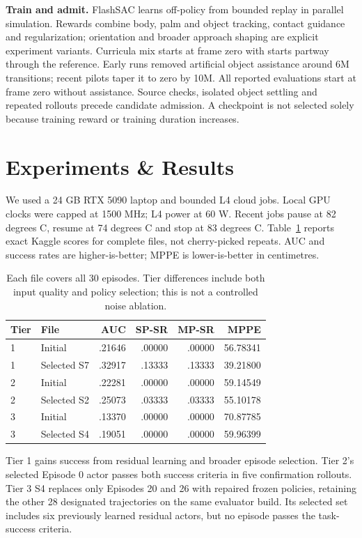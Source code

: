 \documentclass[10pt]{nvidiaextabstract}
\begin{document}
\textbf{Train and admit.}
FlashSAC learns off-policy from bounded replay in parallel simulation. Rewards
combine body, palm and object tracking, contact guidance and regularization;
orientation and broader approach shaping are explicit experiment variants.
Curricula mix starts at frame zero with starts partway through the reference.
Early runs removed artificial object assistance around 6M transitions; recent
pilots taper it to zero by 10M. All reported evaluations start at frame zero
without assistance. Source checks, isolated object settling and repeated
rollouts precede candidate admission. A checkpoint is not selected solely
because training reward or training duration increases.

\section{Experiments \& Results}
We used a 24 GB RTX 5090 laptop and bounded L4 cloud jobs. Local GPU clocks were
capped at 1500 MHz; L4 power at 60 W. Recent jobs pause at 82 degrees C, resume at
74 degrees C and stop at 83 degrees C. Table~\ref{tab:results} reports exact Kaggle
scores for complete files, not cherry-picked repeats. AUC and success rates
are higher-is-better; MPPE is lower-is-better in centimetres.
\begin{table}[t]
\centering\small\setlength{\tabcolsep}{3pt}
\begin{tabular}{llrrrr}
\toprule
Tier & File & AUC & SP-SR & MP-SR & MPPE\\
\midrule
1 & Initial & .21646 & .00000 & .00000 & 56.78341\\
1 & Selected S7 & .32917 & .13333 & .13333 & 39.21800\\
2 & Initial & .22281 & .00000 & .00000 & 59.14549\\
2 & Selected S2 & .25073 & .03333 & .03333 & 55.10178\\
3 & Initial & .13370 & .00000 & .00000 & 70.87785\\
3 & Selected S4 & .19051 & .00000 & .00000 & 59.96399\\
\bottomrule
\end{tabular}
\caption{Each file covers all 30 episodes. Tier differences include both input
quality and policy selection; this is not a controlled noise ablation.}
\label{tab:results}
\end{table}

Tier 1 gains success from residual learning and broader episode selection.
Tier 2's selected Episode 0 actor passes both success criteria in five
confirmation rollouts. Tier 3 S4 replaces only Episodes 20 and 26 with repaired
frozen policies, retaining the other 28 designated trajectories on the same
evaluator build. Its selected set includes six previously learned residual
actors, but no episode passes the task-success criteria.
\end{document}
